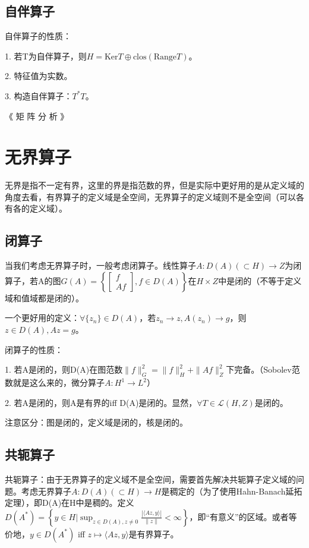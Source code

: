 \subsection{自伴算子}

自伴算子的性质：

1. 若T为自伴算子，则$H = \text{Ker} T \oplus \text{clos}(\text{Range} T)$。

2. 特征值为实数。

3. 构造自伴算子：$T^{\ast}T$。

《 矩 阵 分 析 》

\section{无界算子}

无界是指不一定有界，这里的界是指范数的界，但是实际中更好用的是从定义域的角度去看，有界算子的定义域是全空间，无界算子的定义域则不是全空间（可以各有各的定义域）。

\subsection{闭算子}

当我们考虑无界算子时，一般考虑闭算子。线性算子$A: D(A)(\subset H) \to Z$为闭算子，若A的图$G(A) = \left\{ \left[ \begin{matrix} f\\
  Af
\end{matrix} \right], f \in D(A) \right\}$在$H \times Z$中是闭的（不等于定义域和值域都是闭的）。

一个更好用的定义：$\forall \{ z_n \} \in D(A)$，若$z_n \to z, A(z_n) \to g$，则$z \in D(A), Az = g$。

闭算子的性质：

1. 若A是闭的，则D(A)在图范数$\|f\|_G^2 = \|f\|_H^2 + \|Af\|_Z^2$下完备。（Sobolev范数就是这么来的，微分算子$A: H^1 \to L^2$）

2. 若A是闭的，则A是有界的iff D(A)是闭的。显然，$\forall T \in \mathcal{L}(H, Z)$是闭的。

注意区分：图是闭的，定义域是闭的，核是闭的。

\subsection{共轭算子}

共轭算子：由于无界算子的定义域不是全空间，需要首先解决共轭算子定义域的问题。考虑无界算子$A: D(A)(\subset H) \to H$是稠定的（为了使用Hahn-Banach延拓定理），即D(A)在H中是稠的。定义$D\left(A^{*}\right)=\left\{y \in H | \sup _{z \in D(A), z \neq 0} \frac{|\langle A z, y\rangle|}{\|z\|}<\infty\right\}$，即“有意义”的区域。或者等价地，$y \in D(A^{\ast})$ iff $z \mapsto \langle Az, y \rangle$是有界算子。

